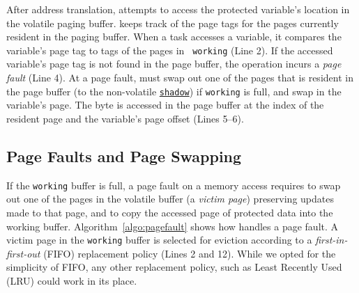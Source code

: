 After address translation, \sys attempts to access the protected variable's
location in the volatile paging buffer. \sys keeps track of the page tags for
the pages currently resident in the paging buffer. When a task accesses a
variable, it compares the variable's page tag to tags of the pages in {\tt
working} (Line 2).
%
%
If the accessed variable's page tag is not found in the page buffer, the
operation incurs a {\em page fault} (Line 4). At a page fault, \sys must swap
out one of the pages that is resident in the page buffer (to the non-volatile
\texttt{\underline{shadow}}) if \texttt{working} is full, and swap in the
variable's page.
%
The byte is accessed in the page buffer at the index of the resident page and
the variable's page offset (Lines 5--6).


\subsection{Page Faults and Page Swapping}

If the \texttt{working} buffer is full, a page fault on a memory access
requires \sys to swap out one of the pages in the volatile buffer (a 
\emph{victim page}) preserving updates made to that page, and to copy the
accessed page of protected data into the working buffer.
Algorithm~\ref{algo:pagefault} shows how \sys handles a page fault. A victim
page in the \texttt{working} buffer is selected for eviction according to
a \emph{first-in-first-out} (FIFO) replacement policy (Lines 2 and 12). 
%
While we opted for the simplicity of FIFO, any other replacement policy, such
as Least Recently Used (LRU) could work in its place.

